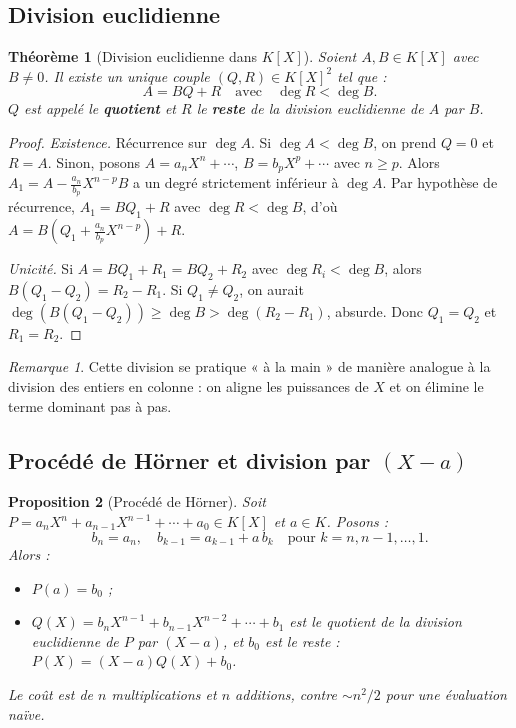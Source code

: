 \documentclass[12pt,a4paper]{report}
\newtheorem{theoreme}{Théorème}[section]
\newtheorem{proposition}[theoreme]{Proposition}
\theoremstyle{definition}
\theoremstyle{remark}
\newtheorem{remarque}{Remarque}[section]
\begin{document}
\subsection{Division euclidienne}

\begin{theoreme}[{Division euclidienne dans $K[X]$}]
Soient $A, B \in K[X]$ avec $B \neq 0$. Il existe un \emph{unique} couple $(Q, R) \in K[X]^2$ tel que :
\[ A = B Q + R \quad \text{avec} \quad \deg R < \deg B. \]
$Q$ est appelé le \textbf{quotient} et $R$ le \textbf{reste} de la division euclidienne de $A$ par $B$.
\end{theoreme}

\begin{proof}
\emph{Existence.} Récurrence sur $\deg A$. Si $\deg A < \deg B$, on prend $Q = 0$ et $R = A$. Sinon, posons $A = a_n X^n + \cdots$, $B = b_p X^p + \cdots$ avec $n \ge p$. Alors $A_1 = A - \frac{a_n}{b_p} X^{n-p} B$ a un degré strictement inférieur à $\deg A$. Par hypothèse de récurrence, $A_1 = B Q_1 + R$ avec $\deg R < \deg B$, d'où $A = B (Q_1 + \frac{a_n}{b_p} X^{n-p}) + R$.

\emph{Unicité.} Si $A = BQ_1 + R_1 = BQ_2 + R_2$ avec $\deg R_i < \deg B$, alors $B(Q_1 - Q_2) = R_2 - R_1$. Si $Q_1 \neq Q_2$, on aurait $\deg(B(Q_1 - Q_2)) \ge \deg B > \deg(R_2 - R_1)$, absurde. Donc $Q_1 = Q_2$ et $R_1 = R_2$.
\end{proof}

\begin{remarque}
Cette division se pratique « à la main » de manière analogue à la division des entiers en colonne : on aligne les puissances de $X$ et on élimine le terme dominant pas à pas.
\end{remarque}

\subsection{Procédé de Hörner et division par $(X - a)$}

\begin{proposition}[Procédé de Hörner]
Soit $P = a_n X^n + a_{n-1} X^{n-1} + \cdots + a_0 \in K[X]$ et $a \in K$. Posons :
\[ b_n = a_n, \quad b_{k-1} = a_{k-1} + a\, b_k \quad \text{pour } k = n, n-1, \dots, 1. \]
Alors :
\begin{itemize}
    \item $P(a) = b_0$ ;
    \item $Q(X) = b_n X^{n-1} + b_{n-1} X^{n-2} + \cdots + b_1$ est le quotient de la division euclidienne de $P$ par $(X - a)$, et $b_0$ est le reste : $P(X) = (X - a) Q(X) + b_0$.
\end{itemize}
Le coût est de $n$ multiplications et $n$ additions, contre $\sim n^2 / 2$ pour une évaluation naïve.
\end{proposition}
\end{document}
